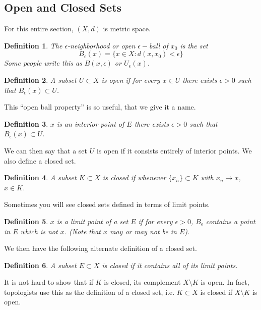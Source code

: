 \documentclass[10pt]{article}         %
\newtheorem{definition}{Definition}[section]
\theoremstyle{remark}
\begin{document}
\subsection{Open and Closed Sets}

For this entire section, $(X, d)$ is metric space.

\begin{definition}
The $\epsilon$-neighborhood or open $\epsilon-$ball of $x_0$ is the set
\[
B_\epsilon(x) = \{ x \in X : d(x,x_0) < \epsilon \}
\]
Some people write this as $B(x, \epsilon)$ or $U_\epsilon(x)$.
\end{definition}

\begin{definition}
A subset $U \subset X$ is \emph{open} if for every $x \in U$ there exists $\epsilon > 0$ such that $B_\epsilon(x) \subset U$.
\end{definition}

This ``open ball property'' is so useful, that we give it a name.

\begin{definition}
$x$ is an \emph{interior point} of $E$ there exists $\epsilon > 0$ such that $B_\epsilon(x) \subset U$.
\end{definition}

We can then say that a set $U$ is open if it consists entirely of interior points. We also define a closed set.

\begin{definition}
A subset $K \subset X$ is \emph{closed} if whenever $\{x_n\} \subset K$ with $x_n \rightarrow x$, $x \in K$.
\end{definition}

Sometimes you will see closed sets defined in terms of limit points.

\begin{definition}
$x$ is a \emph{limit point} of a set $E$ if for every $\epsilon > 0$, $B_\epsilon$ contains a point in $E$ which is not $x$. (Note that $x$ may or may not be in $E$).
\end{definition}

We then have the following alternate definition of a closed set.

\begin{definition}
A subset $E \subset X$ is \emph{closed} if it contains all of its limit points.
\end{definition}

It is not hard to show that if $K$ is closed, its complement $X\setminus K$ is open. In fact, topologists use this as the definition of a closed set, i.e. $K \subset X$ is closed if $X\setminus K$ is open.
\end{document}
